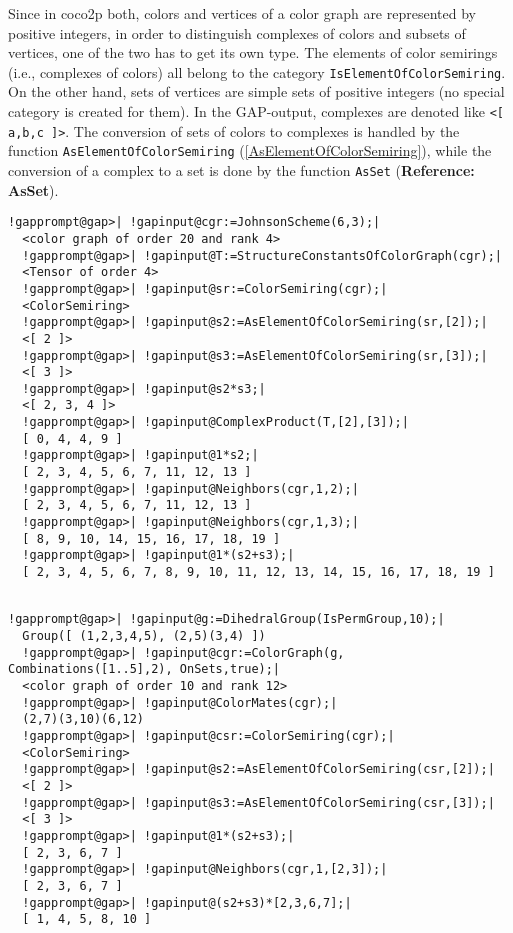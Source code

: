 \documentclass[a4paper,11pt]{report}
\begin{document}
{{ Since in \textsf{coco2p} both, colors and vertices of a color graph are represented by positive
integers, in order to distinguish complexes of colors and subsets of vertices,
one of the two has to get its own type. The elements of color semirings (i.e.,
complexes of colors) all belong to the category \texttt{IsElementOfColorSemiring}. On the other hand, sets of vertices are simple sets of positive integers (no
special category is created for them). In the \textsf{GAP}-output, complexes are denoted like \texttt{{\textless}[ a,b,c ]{\textgreater}}. The conversion of sets of colors to complexes is handled by the function \texttt{AsElementOfColorSemiring} (\ref{AsElementOfColorSemiring}), while the conversion of a complex to a set is done by the function \texttt{AsSet} (\textbf{Reference: AsSet}). 
\begin{Verbatim}[commandchars=!@|,fontsize=\small,frame=single,label=Example]
  !gapprompt@gap>| !gapinput@cgr:=JohnsonScheme(6,3);|
  <color graph of order 20 and rank 4>
  !gapprompt@gap>| !gapinput@T:=StructureConstantsOfColorGraph(cgr);|
  <Tensor of order 4>
  !gapprompt@gap>| !gapinput@sr:=ColorSemiring(cgr);|
  <ColorSemiring>
  !gapprompt@gap>| !gapinput@s2:=AsElementOfColorSemiring(sr,[2]);|
  <[ 2 ]>
  !gapprompt@gap>| !gapinput@s3:=AsElementOfColorSemiring(sr,[3]);|
  <[ 3 ]>
  !gapprompt@gap>| !gapinput@s2*s3;|
  <[ 2, 3, 4 ]>
  !gapprompt@gap>| !gapinput@ComplexProduct(T,[2],[3]);|
  [ 0, 4, 4, 9 ]
  !gapprompt@gap>| !gapinput@1*s2;|
  [ 2, 3, 4, 5, 6, 7, 11, 12, 13 ]
  !gapprompt@gap>| !gapinput@Neighbors(cgr,1,2);|
  [ 2, 3, 4, 5, 6, 7, 11, 12, 13 ]
  !gapprompt@gap>| !gapinput@Neighbors(cgr,1,3);|
  [ 8, 9, 10, 14, 15, 16, 17, 18, 19 ]
  !gapprompt@gap>| !gapinput@1*(s2+s3);|
  [ 2, 3, 4, 5, 6, 7, 8, 9, 10, 11, 12, 13, 14, 15, 16, 17, 18, 19 ]
  	
\end{Verbatim}
 
\begin{Verbatim}[commandchars=!@|,fontsize=\small,frame=single,label=Example]
  !gapprompt@gap>| !gapinput@g:=DihedralGroup(IsPermGroup,10);|
  Group([ (1,2,3,4,5), (2,5)(3,4) ])
  !gapprompt@gap>| !gapinput@cgr:=ColorGraph(g, Combinations([1..5],2), OnSets,true);|
  <color graph of order 10 and rank 12>
  !gapprompt@gap>| !gapinput@ColorMates(cgr);|
  (2,7)(3,10)(6,12)
  !gapprompt@gap>| !gapinput@csr:=ColorSemiring(cgr);|
  <ColorSemiring>
  !gapprompt@gap>| !gapinput@s2:=AsElementOfColorSemiring(csr,[2]);|
  <[ 2 ]>
  !gapprompt@gap>| !gapinput@s3:=AsElementOfColorSemiring(csr,[3]);|
  <[ 3 ]>
  !gapprompt@gap>| !gapinput@1*(s2+s3);|
  [ 2, 3, 6, 7 ]
  !gapprompt@gap>| !gapinput@Neighbors(cgr,1,[2,3]);|
  [ 2, 3, 6, 7 ]
  !gapprompt@gap>| !gapinput@(s2+s3)*[2,3,6,7];|
  [ 1, 4, 5, 8, 10 ]
  	

\end{Verbatim}}}
\end{document}
